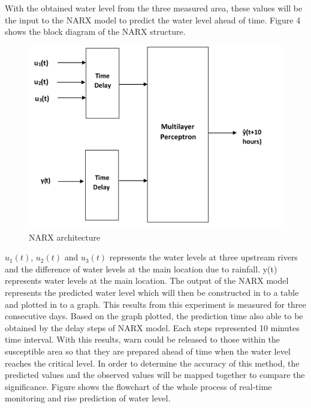 \documentclass[12pt,a4paper,openany]{report}
\begin{document}
With the obtained water level from the three measured area, these values will be the input to the NARX model to predict the water level ahead of time. Figure 4 shows the block diagram of the NARX structure.
\begin{figure}[H]
\centering
\includegraphics[scale=0.6]{./images/NARX}
\caption{NARX architecture}
\end{figure}
\par
$u_{1}(t)$, $u_{2}(t)$ and $u_{3}(t)$ represents the water levels at three upstream rivers and the difference of water levels at the main location due to rainfall. y(t) represents water levels at the main location. 
The output of the NARX model represents the predicted water level which will then be constructed in to a table and plotted in to a graph. This results from this experiment is measured for three consecutive days. Based on the graph plotted, the prediction time also able to be obtained by the delay steps of NARX model. Each steps represented 10 minutes time interval. With this results, warn could be released to those within the susceptible area so that they are prepared ahead of time when the water level reaches the critical level.
In order to determine the accuracy of this method, the predicted values and the observed values will be mapped together to compare the significance. Figure  shows the flowchart of the whole process of real-time monitoring and rise prediction of water level.
\end{document}
